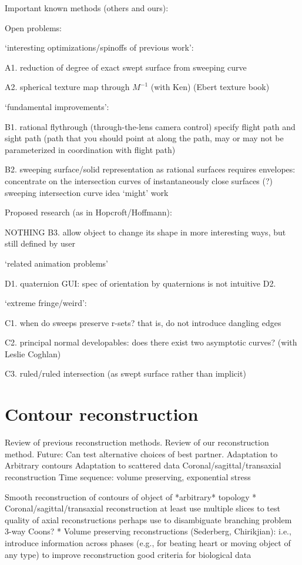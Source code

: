 Important known methods (others and ours):

Open problems:

	`interesting optimizations/spinoffs of previous work':

	A1. reduction of degree of exact swept surface from sweeping curve

	A2. spherical texture map through $M^{-1}$	(with Ken)
			(Ebert texture book)

	`fundamental improvements':

	B1. rational flythrough (through-the-lens camera control)
		specify flight path and sight path (path that
		you should point at along the path, may or may not be
		parameterized in coordination with flight path)

	B2. sweeping surface/solid representation as rational surfaces
		requires envelopes: concentrate on the intersection curves
			of instantaneously close surfaces (?)
		sweeping intersection curve idea `might' work

	Proposed research (as in Hopcroft/Hoffmann):

NOTHING	B3. allow object to change its shape in more interesting ways,
		but still defined by user

	`related animation problems'
	
	D1. quaternion GUI: spec of orientation by quaternions is not intuitive
	D2. 


	`extreme fringe/weird':

	C1. when do sweeps preserve r-sets? that is, do not introduce dangling edges

	C2. principal normal developables: does there exist two asymptotic curves?
		(with Leslie Coghlan)

	C3. ruled/ruled intersection (as swept surface rather than implicit)



\section{Contour reconstruction}

	Review of previous reconstruction methods.
	Review of our reconstruction method.
		Future: Can test alternative choices of best partner.
	Adaptation to Arbitrary contours
	Adaptation to scattered data
	Coronal/sagittal/transaxial reconstruction
	Time sequence: volume preserving, exponential stress
	

	Smooth reconstruction of contours of object of *arbitrary* topology 
*	Coronal/sagittal/transaxial reconstruction
		at least use multiple slices to test quality of axial reconstructions
		perhaps use to disambiguate branching problem
		3-way Coons?
*	Volume preserving reconstructions (Sederberg, Chirikjian):
		i.e., introduce information across phases (e.g., for beating heart
		or moving object of any type) to improve reconstruction
		good criteria for biological data
		
